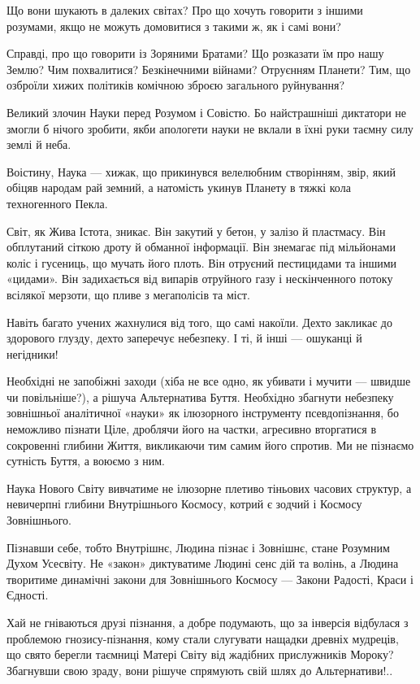 Що вони шукають в далеких світах? Про що хочуть говорити з іншими розумами,
якщо не можуть домовитися з такими ж, як і самі вони?

Справді, про що говорити із Зоряними Братами? Що розказати їм про нашу Землю?
Чим похвалитися? Безкінечними війнами? Отруєнням Планети? Тим, що озброїли
хижих політиків комічною зброєю загального руйнування?

Великий злочин Науки перед Розумом і Совістю. Бо найстрашніші диктатори не
змогли б нічого зробити, якби апологети науки не вклали в їхні руки таємну силу
землі й неба.

Воістину, Наука — хижак, що прикинувся велелюбним створінням, звір, який обіцяв
народам рай земний, а натомість укинув Планету в тяжкі кола техногенного Пекла.

Світ, як Жива Істота, зникає. Він закутий у бетон, у залізо й пластмасу. Він
обплутаний сіткою дроту й обманної інформації. Він знемагає під мільйонами
коліс і гусениць, що мучать його плоть. Він отруєний пестицидами та іншими
«цидами». Він задихається від випарів отруйного газу і нескінченного потоку
всілякої мерзоти, що пливе з мегаполісів та міст.

Навіть багато учених жахнулися від того, що самі накоїли. Дехто закликає до
здорового глузду, дехто заперечує небезпеку. І ті, й інші — ошуканці й
негідники!

Необхідні не запобіжні заходи (хіба не все одно, як убивати і мучити — швидше
чи повільніше?), а рішуча Альтернатива Буття. Необхідно збагнути небезпеку
зовнішньої аналітичної «науки» як ілюзорного інструменту псевдопізнання, бо
неможливо пізнати Ціле, дроблячи його на частки, агресивно вторгатися в
сокровенні глибини Життя, викликаючи тим самим його спротив. Ми не пізнаємо
сутність Буття, а воюємо з ним.

Наука Нового Світу вивчатиме не ілюзорне плетиво тіньових часових структур, а
невичерпні глибини Внутрішнього Космосу, котрий є зодчий і Космосу Зовнішнього.

Пізнавши себе, тобто Внутрішнє, Людина пізнає і Зовнішнє, стане Розумним Духом
Усесвіту. Не «закон» диктуватиме Людині сенс дій та волінь, а Людина творитиме
динамічні закони для Зовнішнього Космосу — Закони Радості, Краси і Єдності.

Хай не гніваються друзі пізнання, а добре подумають, що за інверсія відбулася з
проблемою гнозису-пізнання, кому стали слугувати нащадки древніх мудреців, що
свято берегли таємниці Матері Світу від жадібних прислужників Мороку? Збагнувши
свою зраду, вони рішуче спрямують свій шлях до Альтернативи!..

